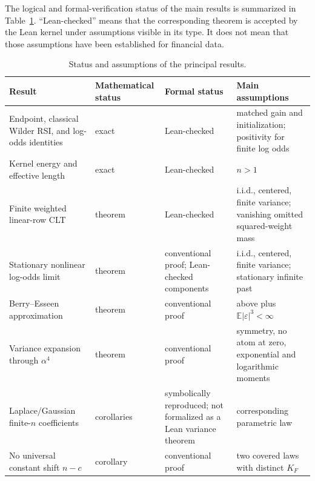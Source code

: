 \documentclass[11pt]{article}
\newcommand{\E}{\mathbb E}
\begin{document}
The logical and formal-verification status of the main results is summarized in
Table~\ref{tab:status}.  ``Lean-checked'' means that the corresponding theorem
is accepted by the Lean kernel under assumptions visible in its type.  It does
not mean that those assumptions have been established for financial data.

\begin{table}[htbp]
\centering
\caption{Status and assumptions of the principal results.}
\label{tab:status}
\scriptsize
\begin{tabular}{>{\raggedright\arraybackslash}p{}>{\raggedright\arraybackslash}p{}>{\raggedright\arraybackslash}p{}>{\raggedright\arraybackslash}p{}}
\toprule
Result & Mathematical status & Formal status & Main assumptions \\
\midrule
Endpoint, classical Wilder RSI, and log-odds identities & exact & Lean-checked & matched gain and initialization; positivity for finite log odds \\
Kernel energy and effective length & exact & Lean-checked & $n>1$ \\
Finite weighted linear-row CLT & theorem & Lean-checked & i.i.d., centered, finite variance; vanishing omitted squared-weight mass \\
Stationary nonlinear log-odds limit & theorem & conventional proof; Lean-checked components & i.i.d., centered, finite variance; stationary infinite past \\
Berry--Esseen approximation & theorem & conventional proof & above plus $\E|\varepsilon|^3<\infty$ \\
Variance expansion through $\alpha^4$ & theorem & conventional proof & symmetry, no atom at zero, exponential and logarithmic moments \\
Laplace/Gaussian finite-$n$ coefficients & corollaries & symbolically reproduced; not formalized as a Lean variance theorem & corresponding parametric law \\
No universal constant shift $n-c$ & corollary & conventional proof & two covered laws with distinct $K_F$ \\
\bottomrule
\end{tabular}
\end{table}
\end{document}
